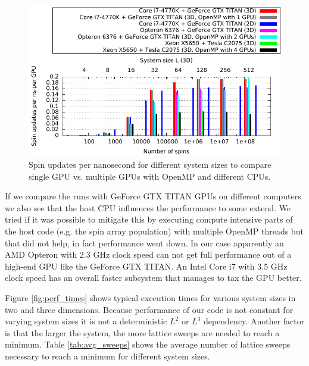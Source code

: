 \documentclass[paper=a4, fontsize=11pt]{scrartcl} %
\numberwithin{equation}{section} %
\numberwithin{figure}{section} %
\numberwithin{table}{section} %
\begin{document}
\begin{figure}
\centering
\includegraphics[width=\textwidth]{images/perf_flips.pdf}
\caption{Spin updates per nanosecond for different system sizes to compare single GPU vs. multiple GPUs with OpenMP and different CPUs.}
\label{fig:perf_flips}
\end{figure}

If we compare the runs with GeForce GTX TITAN GPUs on different computers we also see that the host CPU influences the performance to some extend. We tried if it was possible to mitigate this by executing compute intensive parts of the host code (e.g. the spin array population) with multiple OpenMP threads but that did not help, in fact performance went down. In our case apparently an AMD Opteron with 2.3 GHz clock speed can not get full performance out of a high-end GPU like the GeForce GTX TITAN. An Intel Core i7 with 3.5 GHz clock speed has an overall faster subsystem that manages to tax the GPU better.

Figure \ref{fig:perf_times} shows typical execution times for various system sizes in two and three dimensions. Because performance of our code is not constant for varying system sizes it is not a deterministic $L^2$ or $L^3$ dependency. Another factor is that the larger the system, the more lattice sweeps are needed to reach a minimum. Table \ref{tab:avg_sweeps} shows the average number of lattice sweeps necessary to reach a minimum for different system sizes.
\end{document}
